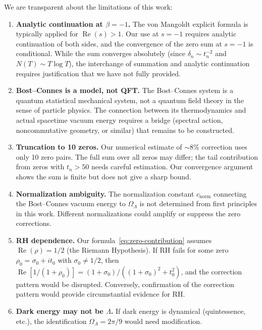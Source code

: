 \documentclass[12pt,a4paper]{article}
\newcommand{\OL}{\Omega_\Lambda}
\begin{document}
We are transparent about the limitations of this work:

\begin{enumerate}[label=(\roman*)]
\item \textbf{Analytic continuation at $\beta = -1$.} The von Mangoldt explicit formula is typically applied for $\operatorname{Re}(s) > 1$. Our use at $s = -1$ requires analytic continuation of both sides, and the convergence of the zero sum at $s = -1$ is conditional. While the sum converges absolutely (since $\delta_n \sim t_n^{-2}$ and $N(T) \sim T\log T$), the interchange of summation and analytic continuation requires justification that we have not fully provided.

\item \textbf{Bost--Connes is a model, not QFT.} The Bost--Connes system is a quantum statistical mechanical system, not a quantum field theory in the sense of particle physics. The connection between its thermodynamics and actual spacetime vacuum energy requires a bridge (spectral action, noncommutative geometry, or similar) that remains to be constructed.

\item \textbf{Truncation to 10 zeros.} Our numerical estimate of $\sim 8\%$ correction uses only 10 zero pairs. The full sum over all zeros may differ; the tail contribution from zeros with $t_n > 50$ needs careful estimation. Our convergence argument shows the sum is finite but does not give a sharp bound.

\item \textbf{Normalization ambiguity.} The normalization constant $c_{\mathrm{norm}}$ connecting the Bost--Connes vacuum energy to $\OL$ is not determined from first principles in this work. Different normalizations could amplify or suppress the zero corrections.

\item \textbf{RH dependence.} Our formula~\eqref{eq:zero-contribution} assumes $\operatorname{Re}(\rho) = 1/2$ (the Riemann Hypothesis). If RH fails for some zero $\rho_0 = \sigma_0 + it_0$ with $\sigma_0 \neq 1/2$, then $\operatorname{Re}[1/(1+\rho_0)] = (1+\sigma_0)/((1+\sigma_0)^2 + t_0^2)$, and the correction pattern would be disrupted. Conversely, confirmation of the correction pattern would provide circumstantial evidence for RH.

\item \textbf{Dark energy may not be $\Lambda$.} If dark energy is dynamical (quintessence, etc.), the identification $\OL = 2\pi/9$ would need modification.
\end{enumerate}
\end{document}
